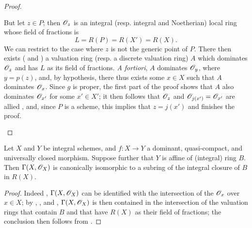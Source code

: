 \begin{proof}
\begin{enumerate}
        But let $z\in P$;
        then $\mathscr{O}_z$ is an integral (resp. integral and Noetherian) local ring whose field of fractions is
        \[
            L = R(P) = R(X') = R(X).
        \]
        We can restrict to the case where $z$ is not the generic point of $P$.
        There then exists ( and ) a valuation ring (resp. a discrete valuation ring) $A$ which dominates $\mathscr{O}_z$ and has $L$ as its field of fractions.
        \emph{A fortiori}, $A$ dominates $\mathscr{O}_y$, where $y=p(z)$, and, by hypothesis, there thus exists some $x\in X$ such that $A$ dominates $\mathscr{O}_x$.
        Since $g$ is proper, the first part of the proof shows that $A$ also dominates $\mathscr{O}_{x'}$ for some $x'\in X'$;
        it then follows that $\mathscr{O}_z$ and $\mathscr{O}_{j(x')}=\mathscr{O}_{x'}$ are allied , and, since $P$ is a scheme, this implies that $z=j(x')$  and finishes the proof.
\end{enumerate}
\end{proof}

\begin{corollary}
\label{II.7.3.11}
Let $X$ and $Y$ be integral schemes, and $f:X\to Y$ a dominant, quasi-compact, and universally closed morphism.
Suppose further that $Y$ is affine of (integral) ring $B$.
Then $\Gamma(X,\mathscr{O}_X)$ is canonically isomorphic to a subring of the integral closure of $B$ in $R(X)$.
\end{corollary}

\begin{proof}
\label{proof-II.7.3.11}
Indeed , $\Gamma(X,\mathscr{O}_X)$ can be identified with the intersection of the $\mathscr{O}_x$ over $x\in X$;
by , , and , $\Gamma(X,\mathscr{O}_X)$ is then contained in the intersection of the valuation rings that contain $B$ and that have $R(X)$ as their field of fractions;
the conclusion then follows from .
\end{proof}

